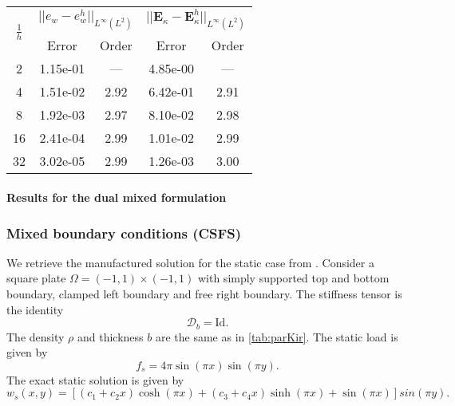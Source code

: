 \begin{table}[hp]
	\centering
	\begin{tabular}{ccccc}
		\hline 
		\multirow{2}{*}{$\frac{1}{h}$} & \multicolumn{2}{c}{$||e_w - e_w^h||_{L^{\infty}(L^2)}$}  & \multicolumn{2}{c}{$||\bm{E}_\kappa - \bm{E}_\kappa^h||_{L^{\infty}(L^2)}$}   \\ 
		& Error & Order  & Error & Order  \\
		\hline 
		2  & 1.15e-01 & ---  & 4.85e-00 & ---  \\ 
		4  & 1.51e-02 & 2.92 & 6.42e-01 & 2.91 \\ 
		8  & 1.92e-03 & 2.97 & 8.10e-02 & 2.98 \\ 
		16 & 2.41e-04 & 2.99 & 1.01e-02 & 2.99 \\ 
		32 & 3.02e-05 & 2.99 & 1.26e-03 & 3.00 \\ 
		\hline 
	\end{tabular} 
	\captionsetup{width=0.95\linewidth}
	\vspace{1mm}
	\label{tab:resminHHJ_SSSS_k3}
\end{table}

\paragraph{Results for the dual mixed formulation}


\subsubsection{Mixed boundary conditions (CSFS)}

We retrieve the manufactured solution for the static case from \cite{rafetseder2018}. Consider a square plate $\Omega = (-1,1)\times (-1,1)$ with simply supported top and  bottom boundary, clamped left boundary and free right boundary. The stiffness tensor is the identity
\begin{equation*}
\bm{\mathcal{D}}_b = \mathrm{Id}.
\end{equation*} 
The density $\rho$ and thickness $b$ are the same as in \ref{tab:parKir}.
The static load is given by
\begin{equation*}
f_s = 4 \pi \sin(\pi x) \sin(\pi y).
\end{equation*}
The exact static solution is given by
\begin{equation*}
w_s(x, y) = [(c_1 + c_2 x) \cosh(\pi x) + (c_3 + c_4 x) \sinh(\pi x) + \sin(\pi x)] sin(\pi y).
\end{equation*}


